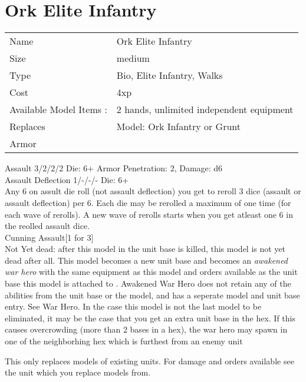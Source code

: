 






\pagebreak

\section{ Ork Elite Infantry }

\begin{tabular}{ll}
  Name & Ork Elite Infantry \\
  Size & medium\\
  Type & Bio, Elite Infantry, Walks\\
  Cost & 4xp\\
  Available Model Items : &2 hands, unlimited independent equipment\\
  Replaces & Model: Ork Infantry or Grunt\\
  Armor & 
\end{tabular}



Assault 3/2/2/2 Die: 6+ Armor Penetration: 2, Damage: d6 \\
Assault Deflection 1/-/-/- Die: 6+\\
Any 6 on assult die roll (not assault deflection) you get to reroll 3 dice (assault or assault deflection) per 6. Each die may be rerolled a maximum of one time (for each wave of rerolls). A new wave of rerolls starts when you get atleast one 6 in the reolled assault dice. \\ Cunning Assault[1 for 3]
\ \\

Not Yet dead: after this model in the unit base is killed, this model is not yet dead after all. This model becomes a new unit base and becomes an {\it awakened war hero} with the same equipment as this model and orders available as the unit base this model is attached to . Awakened War Hero does not retain any of the abilities from the unit base or the model, and has a seperate model and unit base entry. See War Hero. In the case this model is not the last model to be eliminated, it may be the case that you get an extra unit base in the hex. If this causes overcrowding (more than 2 bases in a hex), the war hero may spawn in one of the neighborhing hex which is furthest from an enemy unit



This only replaces models of existing units. For damage and orders available see the unit which you replace models from.



